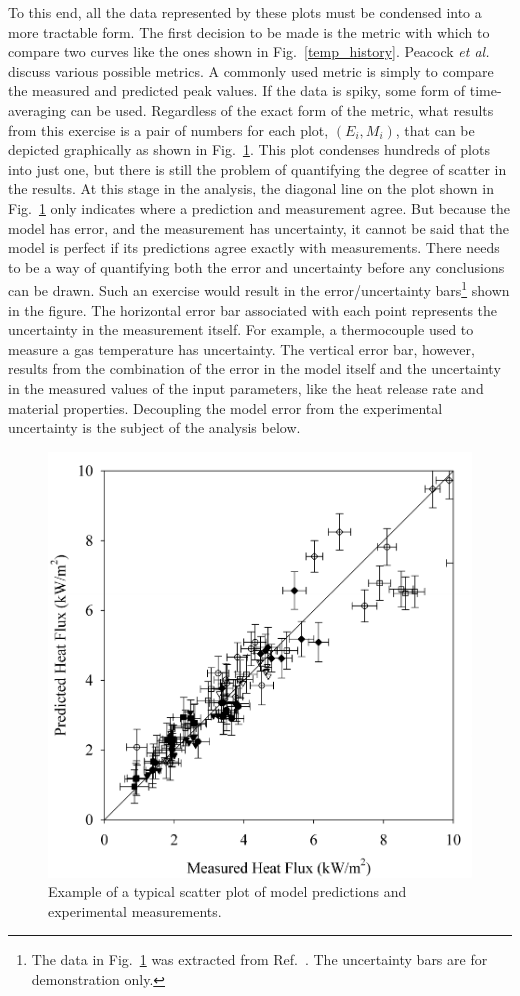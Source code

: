 To this end, all the data represented by these plots must be condensed into a more tractable form. The first decision to be made is
the metric with which to compare two curves like the ones shown in Fig.~\ref{temp_history}. Peacock {\em et al.}~\cite{Peacock:FSJ1999}
discuss various possible metrics. A commonly used metric is simply to compare the measured and predicted peak values.
If the data is spiky, some form of time-averaging can be used. Regardless of the exact form of the metric, what results from
this exercise is a pair of numbers for each plot, $(E_i,M_i)$, that can be depicted graphically as shown in Fig.~\ref{scatterplot}. This plot
condenses hundreds of plots into just one, but there is still the problem of quantifying the degree of scatter in the results. At this stage in the analysis, the
diagonal line on the plot shown in Fig.~\ref{scatterplot} only indicates where a prediction and measurement agree. But because the model has error, and
the measurement has uncertainty, it cannot be said that the model is perfect if its predictions agree exactly with measurements. There needs to be a way of quantifying
both the error and uncertainty before any conclusions can be drawn.
Such an exercise would result in the error/uncertainty bars\footnote{The data in Fig.~\ref{scatterplot} was extracted from Ref.~\cite{NUREG_1824}.
The uncertainty bars are for demonstration only.}
shown in the figure. The
horizontal error bar associated with each point represents the uncertainty in the measurement itself. For example, a thermocouple used to measure a gas
temperature has uncertainty. The vertical error bar, however, results from the combination of the error in the model itself and the uncertainty in the
measured values of the input parameters, like the heat release rate and material properties. Decoupling the model error from the experimental uncertainty
is the subject of the analysis below.

\begin{figure}[t]
\begin{center}
\includegraphics[height=3.in]{FIGURES/scatterplot}
\end{center}
\caption[Sample scatter plot.]{Example of a typical scatter plot of model predictions and experimental measurements.}
\label{scatterplot}
\end{figure}





